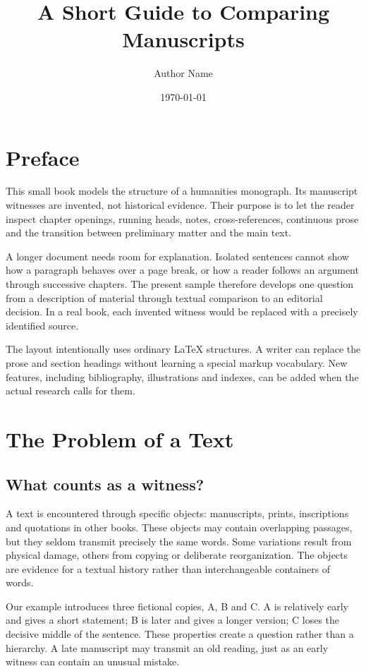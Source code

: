 \documentclass{impebook}
\title{A Short Guide to Comparing Manuscripts}
\author{Author Name}
\date{\today}
\begin{document}
\frontmatter
\maketitle
\chapter*{Preface}
This small book models the structure of a humanities monograph.
Its manuscript witnesses are invented, not historical evidence.
Their purpose is to let the reader inspect chapter openings,
running heads, notes, cross-references, continuous prose and the
transition between preliminary matter and the main text.

A longer document needs room for explanation. Isolated sentences
cannot show how a paragraph behaves over a page break, or how
a reader follows an argument through successive chapters.
The present sample therefore develops one question from a
description of material through textual comparison to an editorial
decision. In a real book, each invented witness would be replaced
with a precisely identified source.

The layout intentionally uses ordinary \LaTeX{} structures.
A writer can replace the prose and section headings without
learning a special markup vocabulary. New features, including
bibliography, illustrations and indexes, can be added when the
actual research calls for them.

\tableofcontents
\mainmatter

\chapter{The Problem of a Text}\label{chap:problem}
\section{What counts as a witness?}
A text is encountered through specific objects: manuscripts,
prints, inscriptions and quotations in other books. These
objects may contain overlapping passages, but they seldom
transmit precisely the same words. Some variations result
from physical damage, others from copying or deliberate
reorganization. The objects are evidence for a textual
history rather than interchangeable containers of words.

Our example introduces three fictional copies, A, B and C.
A is relatively early and gives a short statement; B is
later and gives a longer version; C loses the decisive
middle of the sentence. These properties create a question
rather than a hierarchy. A late manuscript may transmit
an old reading, just as an early witness can contain
an unusual mistake.
\end{document}
